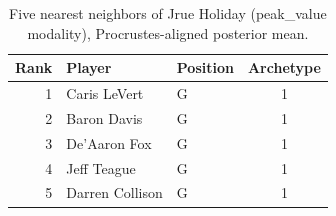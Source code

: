 \begin{table}[htbp]
  \centering\small
  \begin{tabular}{rllc}
    \toprule
    Rank & Player & Position & Archetype \\
    \midrule
    1 & Caris LeVert & G & 1 \\
    2 & Baron Davis & G & 1 \\
    3 & De'Aaron Fox & G & 1 \\
    4 & Jeff Teague & G & 1 \\
    5 & Darren Collison & G & 1 \\
    \bottomrule
  \end{tabular}
  \caption{Five nearest neighbors of Jrue Holiday (peak_value modality), Procrustes-aligned posterior mean.}
  \label{tab:Jrue_Holiday_neighbors_peak_value}
\end{table}

